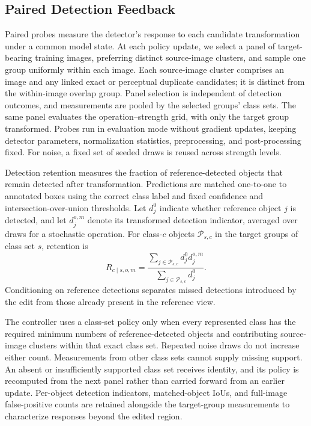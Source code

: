 \documentclass[conference]{IEEEtran}
\begin{document}
\subsection{Paired Detection Feedback}
\label{sec:method_feedback}
Paired probes measure the detector's response to each candidate transformation under a common model state. At each policy update, we select a panel of target-bearing training images, preferring distinct source-image clusters, and sample one group uniformly within each image. Each source-image cluster comprises an image and any linked exact or perceptual duplicate candidates; it is distinct from the within-image overlap group. Panel selection is independent of detection outcomes, and measurements are pooled by the selected groups' class sets. The same panel evaluates the operation--strength grid, with only the target group transformed. Probes run in evaluation mode without gradient updates, keeping detector parameters, normalization statistics, preprocessing, and post-processing fixed. For noise, a fixed set of seeded draws is reused across strength levels.

Detection retention measures the fraction of reference-detected objects that remain detected after transformation. Predictions are matched one-to-one to annotated boxes using the correct class label and fixed confidence and intersection-over-union thresholds. Let $d_j^0$ indicate whether reference object $j$ is detected, and let $d_j^{o,m}$ denote its transformed detection indicator, averaged over draws for a stochastic operation. For class-$c$ objects $\mathcal{P}_{s,c}$ in the target groups of class set $s$, retention is
\begin{equation}
 R_{c\mid s,o,m}=
 \frac{\sum_{j\in\mathcal{P}_{s,c}}d_j^0d_j^{o,m}}
      {\sum_{j\in\mathcal{P}_{s,c}}d_j^0}.
 \label{eq:retention}
\end{equation}
Conditioning on reference detections separates missed detections introduced by the edit from those already present in the reference view.

The controller uses a class-set policy only when every represented class has the required minimum numbers of reference-detected objects and contributing source-image clusters within that exact class set. Repeated noise draws do not increase either count. Measurements from other class sets cannot supply missing support. An absent or insufficiently supported class set receives identity, and its policy is recomputed from the next panel rather than carried forward from an earlier update. Per-object detection indicators, matched-object IoUs, and full-image false-positive counts are retained alongside the target-group measurements to characterize responses beyond the edited region.
\end{document}
